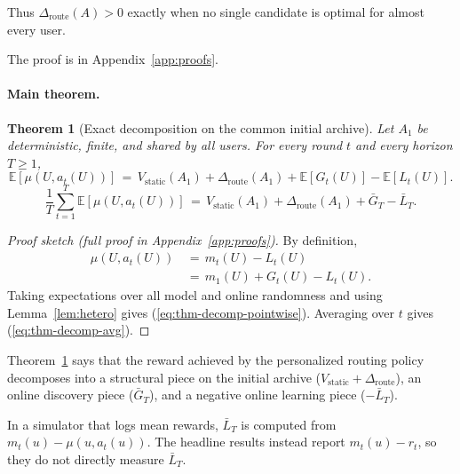 \documentclass{article} %
\newtheorem{theorem}{Theorem}
\providecommand{\E}{\mathbb{E}}
\renewcommand{\eqref}[1]{\textup{(\ref{#1})}}
\begin{document}
Thus \(\Delta_{\mathrm{route}}(A)>0\) exactly when no single candidate is
optimal for almost every user.

The proof is in Appendix~\ref{app:proofs}.

\paragraph{Main theorem.}

\label{sec:method-thm-decomp}

\begin{theorem}[Exact decomposition on the common initial archive]
\label{thm:decomp}
Let $A_1$ be deterministic, finite, and shared by all users. For every round $t$ and every horizon $T \ge 1$,
\begin{equation}
\label{eq:thm-decomp-pointwise}
\E[\mu(U, a_t(U))]
\,=\, V_{\mathrm{static}}(A_1) + \Delta_{\mathrm{route}}(A_1) + \E[G_t(U)] - \E[L_t(U)].
\end{equation}
\begin{equation}
\label{eq:thm-decomp-avg}
\frac{1}{T}\sum_{t=1}^T \E[\mu(U, a_t(U))]
\,=\, V_{\mathrm{static}}(A_1) + \Delta_{\mathrm{route}}(A_1) + \bar G_T - \bar L_T.
\end{equation}
\end{theorem}

\begin{proof}[Proof sketch (full proof in Appendix~\ref{app:proofs})]
By definition,
\begin{equation*}
\begin{aligned}
\mu(U,a_t(U))
&\,=\,m_t(U)-L_t(U)\\
&\,=\,m_1(U)+G_t(U)-L_t(U).
\end{aligned}
\end{equation*}
Taking expectations over all model and online randomness and using
Lemma~\ref{lem:hetero} gives \eqref{eq:thm-decomp-pointwise}. Averaging over
$t$ gives \eqref{eq:thm-decomp-avg}.
\end{proof}

Theorem~\ref{thm:decomp} says that the reward achieved by the personalized routing policy decomposes into a structural piece on the initial archive ($V_{\mathrm{static}}+\Delta_{\mathrm{route}}$), an online discovery piece ($\bar G_T$), and a negative online learning piece ($-\bar L_T$).

In a simulator that logs mean rewards, \(\bar L_T\) is computed from
\(m_t(u)-\mu(u,a_t(u))\). The headline results instead report
\(m_t(u)-r_t\), so they do not directly measure \(\bar L_T\).
\end{document}

